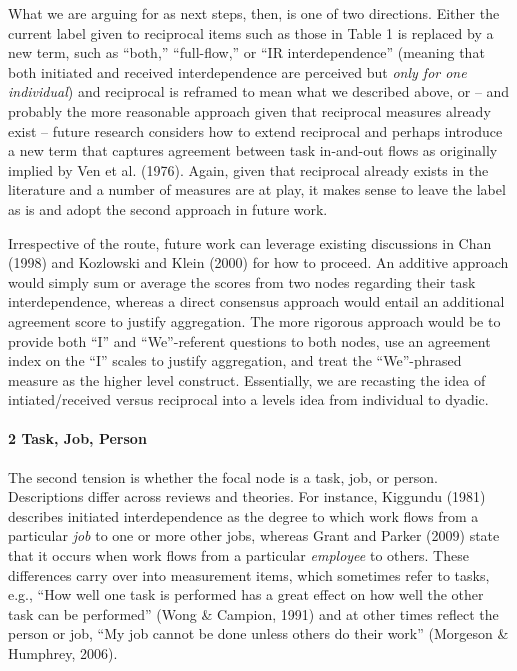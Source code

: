\documentclass[english,,man]{apa6}
\let\oldparagraph\paragraph
\renewcommand{\paragraph}[1]{\oldparagraph{#1}\mbox{}}
\theoremstyle{definition}
\theoremstyle{definition}
\theoremstyle{definition}
\theoremstyle{remark}
\begin{document}
What we are arguing for as next steps, then, is one of two directions.
Either the current label given to reciprocal items such as those in
Table 1 is replaced by a new term, such as \enquote{both,}
\enquote{full-flow,} or \enquote{IR interdependence} (meaning that both
initiated and received interdependence are perceived but \emph{only for
one individual}) and reciprocal is reframed to mean what we described
above, or -- and probably the more reasonable approach given that
reciprocal measures already exist -- future research considers how to
extend reciprocal and perhaps introduce a new term that captures
agreement between task in-and-out flows as originally implied by Ven et
al. (1976). Again, given that reciprocal already exists in the
literature and a number of measures are at play, it makes sense to leave
the label as is and adopt the second approach in future work.

Irrespective of the route, future work can leverage existing discussions
in Chan (1998) and Kozlowski and Klein (2000) for how to proceed. An
additive approach would simply sum or average the scores from two nodes
regarding their task interdependence, whereas a direct consensus
approach would entail an additional agreement score to justify
aggregation. The more rigorous approach would be to provide both
\enquote{I} and \enquote{We}-referent questions to both nodes, use an
agreement index on the \enquote{I} scales to justify aggregation, and
treat the \enquote{We}-phrased measure as the higher level construct.
Essentially, we are recasting the idea of intiated/received versus
reciprocal into a levels idea from individual to dyadic.

\hypertarget{task-job-person}{%
\paragraph{2 Task, Job, Person}\label{task-job-person}}

The second tension is whether the focal node is a task, job, or person.
Descriptions differ across reviews and theories. For instance, Kiggundu
(1981) describes initiated interdependence as the degree to which work
flows from a particular \emph{job} to one or more other jobs, whereas
Grant and Parker (2009) state that it occurs when work flows from a
particular \emph{employee} to others. These differences carry over into
measurement items, which sometimes refer to tasks, e.g., \enquote{How
well one task is performed has a great effect on how well the other task
can be performed} (Wong \& Campion, 1991) and at other times reflect the
person or job, \enquote{My job cannot be done unless others do their
work} (Morgeson \& Humphrey, 2006).
\end{document}
